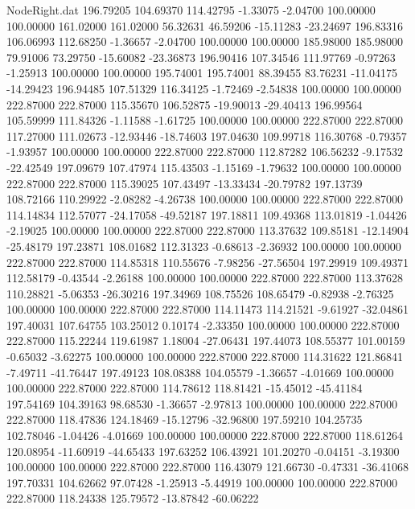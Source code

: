 \begin{filecontents}{NodeRight.dat}
 196.79205  104.69370  114.42795    -1.33075   -2.04700  100.00000  100.00000  161.02000  161.02000   56.32631   46.59206  -15.11283  -23.24697
 196.83316  106.06993  112.68250    -1.36657   -2.04700  100.00000  100.00000  185.98000  185.98000   79.91006   73.29750  -15.60082  -23.36873
 196.90416  107.34546  111.97769    -0.97263   -1.25913  100.00000  100.00000  195.74001  195.74001   88.39455   83.76231  -11.04175  -14.29423
 196.94485  107.51329  116.34125    -1.72469   -2.54838  100.00000  100.00000  222.87000  222.87000  115.35670  106.52875  -19.90013  -29.40413
 196.99564  105.59999  111.84326    -1.11588   -1.61725  100.00000  100.00000  222.87000  222.87000  117.27000  111.02673  -12.93446  -18.74603
 197.04630  109.99718  116.30768    -0.79357   -1.93957  100.00000  100.00000  222.87000  222.87000  112.87282  106.56232   -9.17532  -22.42549
 197.09679  107.47974  115.43503    -1.15169   -1.79632  100.00000  100.00000  222.87000  222.87000  115.39025  107.43497  -13.33434  -20.79782
 197.13739  108.72166  110.29922    -2.08282   -4.26738  100.00000  100.00000  222.87000  222.87000  114.14834  112.57077  -24.17058  -49.52187
 197.18811  109.49368  113.01819    -1.04426   -2.19025  100.00000  100.00000  222.87000  222.87000  113.37632  109.85181  -12.14904  -25.48179
 197.23871  108.01682  112.31323    -0.68613   -2.36932  100.00000  100.00000  222.87000  222.87000  114.85318  110.55676   -7.98256  -27.56504
 197.29919  109.49371  112.58179    -0.43544   -2.26188  100.00000  100.00000  222.87000  222.87000  113.37628  110.28821   -5.06353  -26.30216
 197.34969  108.75526  108.65479    -0.82938   -2.76325  100.00000  100.00000  222.87000  222.87000  114.11473  114.21521   -9.61927  -32.04861
 197.40031  107.64755  103.25012     0.10174   -2.33350  100.00000  100.00000  222.87000  222.87000  115.22244  119.61987    1.18004  -27.06431
 197.44073  108.55377  101.00159    -0.65032   -3.62275  100.00000  100.00000  222.87000  222.87000  114.31622  121.86841   -7.49711  -41.76447
 197.49123  108.08388  104.05579    -1.36657   -4.01669  100.00000  100.00000  222.87000  222.87000  114.78612  118.81421  -15.45012  -45.41184
 197.54169  104.39163   98.68530    -1.36657   -2.97813  100.00000  100.00000  222.87000  222.87000  118.47836  124.18469  -15.12796  -32.96800
 197.59210  104.25735  102.78046    -1.04426   -4.01669  100.00000  100.00000  222.87000  222.87000  118.61264  120.08954  -11.60919  -44.65433
 197.63252  106.43921  101.20270    -0.04151   -3.19300  100.00000  100.00000  222.87000  222.87000  116.43079  121.66730   -0.47331  -36.41068
 197.70331  104.62662   97.07428    -1.25913   -5.44919  100.00000  100.00000  222.87000  222.87000  118.24338  125.79572  -13.87842  -60.06222

\end{filecontents}
